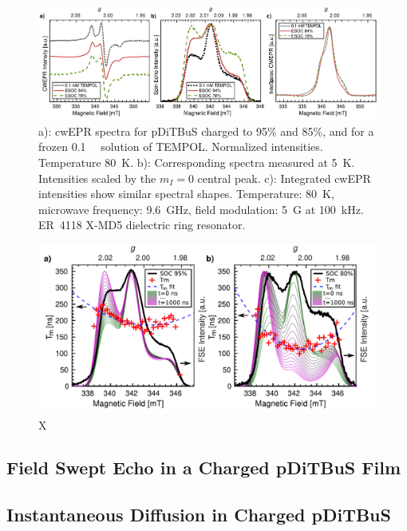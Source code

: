 \begin{figure}[h]
\center
	\includegraphics[width=1\textwidth]{./pulse/figures/Figure_3_INTS.pdf}
	\caption{a): cwEPR spectra for pDiTBuS charged to 95\% and 85\%, and for a frozen 0.1~\si{\milli\Molar}  solution of TEMPOL. Normalized intensities. Temperature 80~K. b): Corresponding  spectra measured at 5~K. Intensities scaled by the $m_I=0$ central peak. c): Integrated cwEPR intensities show similar spectral shapes. Temperature: 80~K, microwave frequency: 9.6~GHz, field modulation: 5~G at 100~kHz. ER~4118 X-MD5 dielectric ring resonator.}
	\label{fig:FSE_vs_CW_vs_INTS_DiTBuS}
\end{figure}


\begin{figure}[h]
\center
	\includegraphics[width=1\textwidth]{./pulse/figures/Figure_6_maintext_col_MOD.pdf}
	\caption{X}
	\label{fig:FSE_reconstruction_with_T2}
\end{figure}



\subsection{Field Swept Echo in a Charged pDiTBuS Film}


\subsection{Instantaneous Diffusion in Charged pDiTBuS}
\label{S:ID}

